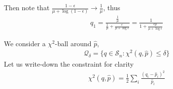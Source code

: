 \documentclass{article}
\begin{document}
\newpage

%

\newpage


Then note that $\frac{1-\epsilon}{\mu + \log (1-\epsilon)} \to \frac{1}{\mu}$, thus
\begin{align}
q_1 = \frac{\frac{1}{\mu}}{\frac{1}{\mu} + \frac{\epsilon}{\mu + \log \epsilon}} =
\frac{1}{1 + \frac{\epsilon \mu}{\mu + \log \epsilon}} 
\end{align}

\newpage


We consider a $\chi^2$-ball around $\hat p$,
\begin{align}
\mathcal Q_\delta = \{ q \in \mathcal S_n: \chi^2(q,\hat p) \le \delta\}
\end{align}
Let us write-down the constraint for clarity 
\begin{align}
\chi^2(q,\hat p) = \frac 12 \sum_i \frac{(q_i-\hat p_i)^2}{\hat p_i}
\end{align}



\end{document}
